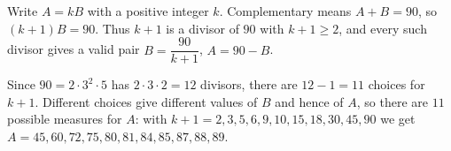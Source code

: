 Write $A=kB$ with a positive integer $k$. Complementary means $A+B=90$, so $(k+1)B=90$. Thus $k+1$ is a divisor of $90$ with $k+1\ge2$, and every such divisor gives a valid pair $B=\dfrac{90}{k+1}$, $A=90-B$.

Since $90=2\cdot3^2\cdot5$ has $2\cdot3\cdot2=12$ divisors, there are $12-1=11$ choices for $k+1$. Different choices give different values of $B$ and hence of $A$, so there are $\boxed{11}$ possible measures for $A$: with $k+1=2,3,5,6,9,10,15,18,30,45,90$ we get $A=45,60,72,75,80,81,84,85,87,88,89$.
